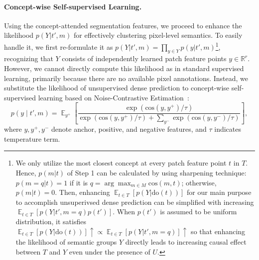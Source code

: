 \documentclass{article} \usepackage{iclr2024_conference,times}
\begin{document}
\paragraph{Concept-wise Self-supervised Learning.} 
Using the concept-attended segmentation features, we proceed to enhance the likelihood $p(Y|t', m)$ for effectively clustering pixel-level semantics. To easily handle it, we first re-formulate it as $p(Y|t', m)=\prod_{y\in Y}p(y|t', m)$\footnote{We only utilize the most closest concept at every patch feature point $t$ in $T$. Hence, $p(m|t)$ of Step 1 can be calculated by using sharpening technique: $p(m{=}q|t){=}1$ if it is $q{=}\arg\max_{m\in M} \text{cos}(m,t)$; otherwise, $p(m|t){=}0$. Then, enhancing $\mathop{\mathbb{E}}_{t\in T}\left[p(Y|\text{do}(t) )\right]$ for our main purpose to accomplish unsuperivsed dense prediction can be simplified with increasing $\mathop{\mathbb{E}}_{t\in T}\left[{p(Y|t', m{=}q)}p(t')\right]$. When $p(t')$ is assumed to be uniform distribution, it satisfies $\mathop{\mathbb{E}}_{t\in T}\left[p(Y|\text{do}(t))\right]\uparrow \propto \mathop{\mathbb{E}}_{t\in T}\left[p(Y|t', m{=}q)\right]\uparrow$ so that enhancing the likelihood of semantic groups $Y$ directly leads to increasing causal effect between $T$ and $Y$ even under the presence of $U$.}, recognizing that $Y$ consists of independently learned patch feature points $y\in\mathbb{R}^{r}$. 
However, we cannot directly compute this likelihood as in standard supervised learning, primarily because there are no available pixel annotations. Instead, we substitute the likelihood of unsupervised dense prediction to concept-wise self-supervised learning based on Noise-Contrastive Estimation~\citep{gutmann2010noise}:
\begin{equation}
    p(y\mid t', m)= \mathop{\mathbb{E}}_{y^{+}}\left[\frac{\exp(\text{cos}(y, y^{+}) / \tau)}{\exp(\text{cos}(y, y^{+})/\tau) + \sum_{y^{-}} \exp(\text{cos}(y, y^{-}) / \tau)}\right],
    \label{eqn:likelihood_modification}
\end{equation}
where $y,y^{+},y^{-}$ denote anchor, positive, and negative features, and $\tau$ indicates temperature term.
\end{document}
